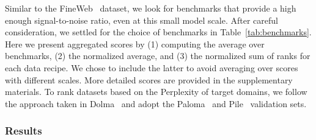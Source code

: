 \documentclass{article}
\begin{document}
Similar to the FineWeb~\cite{penedo2024fineweb} dataset, we look for benchmarks that provide a high enough signal-to-noise ratio, even at this small model scale. 
After careful consideration, we settled for the choice of benchmarks in Table~\ref{tab:benchmarks}. Here we present aggregated scores by (1) computing the average over benchmarks, (2) the normalized average, and (3) the normalized sum of ranks for each data recipe. We chose to include the latter to avoid averaging over scores with different scales. More detailed scores are provided in the supplementary materials. To rank datasets based on the Perplexity of target domains, we follow the approach taken in Dolma~\cite{soldaini2024dolma} and adopt the Paloma~\cite{magnusson2023paloma} and Pile~\cite{gao2020pile} validation sets.


\subsubsection{Results}
\end{document}
